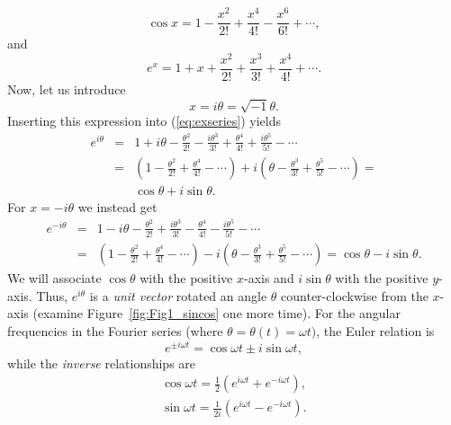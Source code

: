 \begin{equation}
\cos x = 1 - \frac{x^2}{2!} + \frac{x^4}{4!} - \frac{x^6}{6!} + \cdots,
\end{equation}
and
\begin{equation}
e^x = 1+ x + \frac{x^2}{2!} + \frac{x^3}{3!} + \frac{x^4}{4!} + \cdots.
\label{eq:exseries}
\end{equation}
Now, let us introduce
$$
x = i \theta = \sqrt{-1} \theta.
$$
Inserting this expression into (\ref{eq:exseries}) yields
\begin{equation}
\begin{array}{rcl}
e^{i\theta} & = & \displaystyle 1 + i\theta-\frac{\theta^2}{2!} - \frac{i \theta^3}{3!}
+ \frac{\theta^4}{4!} + \frac{i \theta^5}{5!} - \cdots \\[14pt]
& = & \displaystyle \left ( 1 - \frac{\theta^2}{2!} + \frac{\theta^4}{4!} - \cdots\right )
+ i \left ( \theta - \frac{\theta^3}{3!} + \frac{\theta^5}{5!} - \cdots \right ) = \\[14pt]
& & \cos \theta + i \sin \theta.
\end{array}
\end{equation}
For $x = -i\theta$ we instead get
$$
\begin{array}{rcl}
e^{-i\theta} & = & \displaystyle 1 - i\theta - \frac{\theta^2}{2!} + \frac{i \theta^3}{3!} - \frac{\theta^4}{4!} - \frac{i \theta^5}{5!} - \cdots \\[14pt]
& = & \displaystyle \left ( 1 -\frac{\theta^2}{2!} + \frac{\theta^4}{4!} - \cdots\right ) - i\left ( \theta - \frac{\theta^3}{3!} + \frac{\theta^5}{5!} - \cdots\right ) = \cos \theta - i \sin \theta.
\end{array}
$$
We will associate $\cos \theta$ with the positive $x$-axis and $i \sin \theta$ with the positive $y$-axis.
Thus, $e^{i\theta}$ is a \emph{unit vector} rotated an angle $\theta$ counter-clockwise from the $x$-axis
(examine Figure~\ref{fig:Fig1_sincos} one more time). For the
angular frequencies in the Fourier series (where $\theta = \theta(t) = \omega t)$, the Euler relation is
\begin{equation}
\boxed{e^{\pm i\omega t} = \cos \omega t \pm i \sin \omega t,}
\label{eq:eulerrelation}
\end{equation}
while the \emph{inverse} relationships are
\begin{equation}
\begin{array}{c}
\cos \omega t = \frac{1}{2} (e^{i\omega t} + e^{-i \omega t} ), \\[14pt]
\sin \omega t = \frac{1}{2 i } (e^{i\omega t} - e^{-i \omega t} ).
\end{array}
\end{equation}
